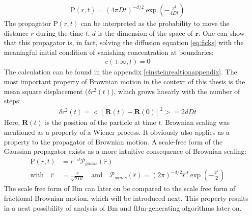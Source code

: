 \documentclass[
  a4paper,BCOR10mm,twoside,
  headsepline,footsepline,%
  fleqn,openbib
]{scrbook}
\begin{document}
\begin{align}
 \mathrm{P}(r,t)=  \left(4 \pi D t\right)^{-d/2} \exp \left(- \frac{r^2}{4 D t} \right) \label{propagator}
\end{align}
The propagator $\mathrm{P}(r,t)$ can be interpreted as the probability to move the distance $r$ during the time $t$. $d$ is the dimension of the space of $\bm{r}$. One can show that this propagator is, in fact, solving the diffusion equation \cref{eq:ficks} with the meaningful initial condition of vanishing concentration at boundaries: 
\begin{align}
c(\pm \infty,t)=0
\end{align}
The calculation can be found in the appendix \ref{einsteinrealtionappendix}. The most important property of Brownian motion in the context of this thesis  is the mean square displacement ($\delta r^2(t)$), which grows linearly with the number of steps: 
\begin{align}
\delta r^2(t)=<[\bm{R}(t)-\bm{R}(0)]^2>= 2dDt                                                                                                                                                                                                                                                                                                                                \end{align}
Here, $\bm{R}(t)$ is the position of the particle at time $t$.
Brownian scaling was mentioned as a property of a Wiener process. It obviously also applies as a property to the propagator of Brownian motion. A scale-free form of the Gaussian propagator exists as a more intuitive consequence of Brownian scaling: 
\begin{align}
\mathrm{P}(r,t)&= r^{-d} \mathcal{P}_{gauss}(\hat{r}) \\ \text{with} \quad \hat{r} &= \frac{r}{\sqrt{2Dt}} \quad \text{and} \quad \mathcal{P}_{gauss}(\hat{r})= (2 \pi)^{-d/2}  \hat{r}^d \exp \left(- \frac{\hat{r}^2}{2} \right) \label{scalefreeform} 
\end{align}
The scale free form of Bm can later on be compared to the scale free form of fractional Brownian motion, which will be introduced next. This property results in a neat possibility of analysis of Bm and fBm-generating algorithms later on.


\end{document}
